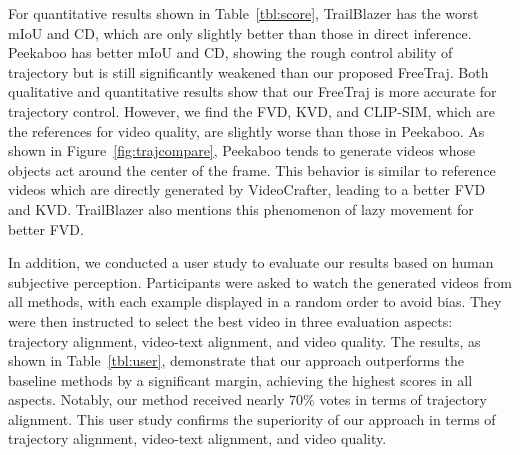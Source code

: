 For quantitative results shown in Table~\ref{tbl:score}, TrailBlazer has the worst mIoU and CD, which are only slightly better than those in direct inference. Peekaboo has better mIoU and CD, showing the rough control ability of trajectory but is still significantly weakened than our proposed FreeTraj. Both qualitative and quantitative results show that our FreeTraj is more accurate for trajectory control. However, we find the FVD, KVD, and CLIP-SIM, which are the references for video quality, are slightly worse than those in Peekaboo. As shown in Figure~\ref{fig:trajcompare}, Peekaboo tends to generate videos whose objects act around the center of the frame. This behavior is similar to reference videos which are directly generated by VideoCrafter, leading to a better FVD and KVD. TrailBlazer also mentions this phenomenon of lazy movement for better FVD.


In addition, we conducted a user study to evaluate our results based on human subjective perception. Participants were asked to watch the generated videos from all methods, with each example displayed in a random order to avoid bias. They were then instructed to select the best video in three evaluation aspects: trajectory alignment, video-text alignment, and video quality. The results, as shown in Table~\ref{tbl:user}, demonstrate that our approach outperforms the baseline methods by a significant margin, achieving the highest scores in all aspects. Notably, our method received nearly $70\%$ votes in terms of trajectory alignment. This user study confirms the superiority of our approach in terms of trajectory alignment, video-text alignment, and video quality.

\begin{table}[t]
\caption{\textbf{User study.} Users are requested to pick the best one among our proposed FreeTraj with the other baseline methods in terms of trajectory alignment, video-text alignment, and video quality.}
\vspace{-0.5em}
% 
\label{tbl:user}
\begin{center}
\vspace{-0.5em}
\end{center}
\end{table}

